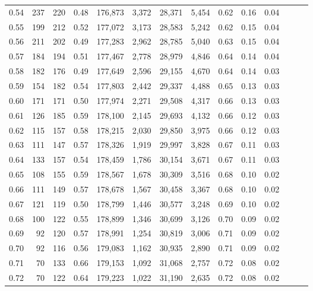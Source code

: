 \begin{tabular}{rrrrrrrrrrrrrr}
0.54 &     237 &  220 &  0.48 &  176,873 &    3,372 &  28,371 &   5,454 &  0.62 &  0.16 &      0.04 \\
0.55 &     199 &  212 &  0.52 &  177,072 &    3,173 &  28,583 &   5,242 &  0.62 &  0.15 &      0.04 \\
0.56 &     211 &  202 &  0.49 &  177,283 &    2,962 &  28,785 &   5,040 &  0.63 &  0.15 &      0.04 \\
0.57 &     184 &  194 &  0.51 &  177,467 &    2,778 &  28,979 &   4,846 &  0.64 &  0.14 &      0.04 \\
0.58 &     182 &  176 &  0.49 &  177,649 &    2,596 &  29,155 &   4,670 &  0.64 &  0.14 &      0.03 \\
0.59 &     154 &  182 &  0.54 &  177,803 &    2,442 &  29,337 &   4,488 &  0.65 &  0.13 &      0.03 \\
0.60 &     171 &  171 &  0.50 &  177,974 &    2,271 &  29,508 &   4,317 &  0.66 &  0.13 &      0.03 \\
0.61 &     126 &  185 &  0.59 &  178,100 &    2,145 &  29,693 &   4,132 &  0.66 &  0.12 &      0.03 \\
0.62 &     115 &  157 &  0.58 &  178,215 &    2,030 &  29,850 &   3,975 &  0.66 &  0.12 &      0.03 \\
0.63 &     111 &  147 &  0.57 &  178,326 &    1,919 &  29,997 &   3,828 &  0.67 &  0.11 &      0.03 \\
0.64 &     133 &  157 &  0.54 &  178,459 &    1,786 &  30,154 &   3,671 &  0.67 &  0.11 &      0.03 \\
0.65 &     108 &  155 &  0.59 &  178,567 &    1,678 &  30,309 &   3,516 &  0.68 &  0.10 &      0.02 \\
0.66 &     111 &  149 &  0.57 &  178,678 &    1,567 &  30,458 &   3,367 &  0.68 &  0.10 &      0.02 \\
0.67 &     121 &  119 &  0.50 &  178,799 &    1,446 &  30,577 &   3,248 &  0.69 &  0.10 &      0.02 \\
0.68 &     100 &  122 &  0.55 &  178,899 &    1,346 &  30,699 &   3,126 &  0.70 &  0.09 &      0.02 \\
0.69 &      92 &  120 &  0.57 &  178,991 &    1,254 &  30,819 &   3,006 &  0.71 &  0.09 &      0.02 \\
0.70 &      92 &  116 &  0.56 &  179,083 &    1,162 &  30,935 &   2,890 &  0.71 &  0.09 &      0.02 \\
0.71 &      70 &  133 &  0.66 &  179,153 &    1,092 &  31,068 &   2,757 &  0.72 &  0.08 &      0.02 \\
0.72 &      70 &  122 &  0.64 &  179,223 &    1,022 &  31,190 &   2,635 &  0.72 &  0.08 &      0.02 \\

\end{tabular}
